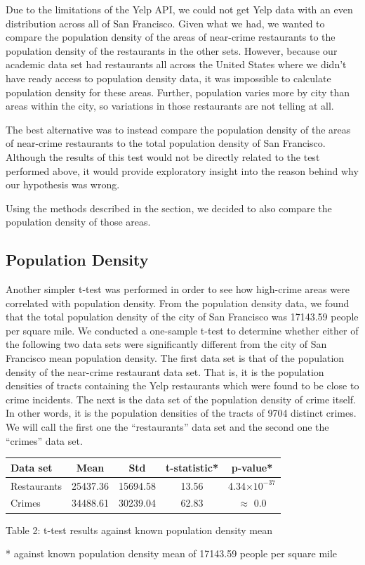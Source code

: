 \documentclass{article}
\providecommand{\e}[1]{\ensuremath{\times 10^{#1}}}
\begin{document}
Due to the limitations of the Yelp API, we could not get Yelp data with an
even distribution across all of San Francisco. Given what we had, we wanted
to compare the population density of the areas of near-crime restaurants to
the population density of the restaurants in the other sets. However,
because our academic data set had restaurants all across the United States
where we didn't have ready access to population density data, it was
impossible to calculate population density for these areas. Further,
population varies more by city than areas within the city, so variations in
those restaurants are not telling at all.

The best alternative was to instead compare the population density of the
areas of near-crime restaurants to the total population density of San
Francisco. Although the results of this test would not be directly related
to the test performed above, it would provide exploratory insight into the
reason behind why our hypothesis was wrong.

Using the methods described in the \textbf{} section,
we decided to also compare the population density of those areas.

\subsection{Population Density}

Another simpler t-test was performed in order to see how high-crime areas
were correlated with population density. From the population density data,
we found that the total population density of the city of San Francisco was
17143.59 people per square mile. We conducted a one-sample t-test to
determine whether either of the following two data sets were significantly
different from the city of San Francisco mean population density. The first
data set is that of the population density of the near-crime restaurant
data set. That is, it is the population densities of tracts containing the
Yelp restaurants which were found to be close to crime incidents. The next
is the data set of the population density of crime itself. In other words,
it is the population densities of the tracts of 9704 distinct crimes. We
will call the first one the ``restaurants'' data set and the second one the
``crimes'' data set.

\begin{center}
  \begin{tabular}{ | l | c | c | c | c | }
    \hline
    Data set    & Mean     & Std      & t-statistic* & p-value*      \\
    \hline
    Restaurants & 25437.36 & 15694.58 & 13.56        & 4.34\e{-37}   \\
    Crimes      & 34488.61 & 30239.04 & 62.83        & $\approx$ 0.0 \\
    \hline
  \end{tabular}

  Table 2: t-test results against known population density mean
\end{center}
* against known population density mean of 17143.59 people per square mile
\end{document}
